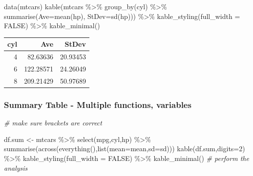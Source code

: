 \documentclass[
]{article}
\newenvironment{Shaded}{\begin{snugshade}}{\end{snugshade}}
\newcommand{\AttributeTok}[1]{\textcolor[rgb]{0.77,0.63,0.00}{#1}}
\newcommand{\CommentTok}[1]{\textcolor[rgb]{0.56,0.35,0.01}{\textit{#1}}}
\newcommand{\ConstantTok}[1]{\textcolor[rgb]{0.00,0.00,0.00}{#1}}
\newcommand{\DecValTok}[1]{\textcolor[rgb]{0.00,0.00,0.81}{#1}}
\newcommand{\FunctionTok}[1]{\textcolor[rgb]{0.00,0.00,0.00}{#1}}
\newcommand{\NormalTok}[1]{#1}
\newcommand{\OtherTok}[1]{\textcolor[rgb]{0.56,0.35,0.01}{#1}}
\newcommand{\SpecialCharTok}[1]{\textcolor[rgb]{0.00,0.00,0.00}{#1}}
\begin{document}
\begin{Shaded}
\begin{Highlighting}[]
\FunctionTok{data}\NormalTok{(mtcars)}
\FunctionTok{kable}\NormalTok{(mtcars }\SpecialCharTok{\%\textgreater{}\%} \FunctionTok{group\_by}\NormalTok{(cyl) }\SpecialCharTok{\%\textgreater{}\%} \FunctionTok{summarise}\NormalTok{(}\AttributeTok{Ave=}\FunctionTok{mean}\NormalTok{(hp), }\AttributeTok{StDev=}\FunctionTok{sd}\NormalTok{(hp))) }\SpecialCharTok{\%\textgreater{}\%} 
  \FunctionTok{kable\_styling}\NormalTok{(}\AttributeTok{full\_width =} \ConstantTok{FALSE}\NormalTok{) }\SpecialCharTok{\%\textgreater{}\%} \FunctionTok{kable\_minimal}\NormalTok{()}
\end{Highlighting}
\end{Shaded}

\begin{table}
\centering
\begin{tabular}{r|r|r}
\hline
cyl & Ave & StDev\\
\hline
4 & 82.63636 & 20.93453\\
\hline
6 & 122.28571 & 24.26049\\
\hline
8 & 209.21429 & 50.97689\\
\hline
\end{tabular}
\end{table}

\hypertarget{summary-table---multiple-functions-variables}{%
\subsubsection{Summary Table - Multiple functions, variables}\label{summary-table---multiple-functions-variables}}

\begin{Shaded}
\begin{Highlighting}[]
\CommentTok{\# make sure brackets are correct}

\NormalTok{df.sum }\OtherTok{\textless{}{-}}\NormalTok{ mtcars }\SpecialCharTok{\%\textgreater{}\%}  \FunctionTok{select}\NormalTok{(mpg,cyl,hp) }\SpecialCharTok{\%\textgreater{}\%}
  \FunctionTok{summarise}\NormalTok{(}\FunctionTok{across}\NormalTok{(}\FunctionTok{everything}\NormalTok{(),}\FunctionTok{list}\NormalTok{(}\AttributeTok{mean=}\NormalTok{mean,}\AttributeTok{sd=}\NormalTok{sd)))}
\FunctionTok{kable}\NormalTok{(df.sum,}\AttributeTok{digits=}\DecValTok{2}\NormalTok{) }\SpecialCharTok{\%\textgreater{}\%} \FunctionTok{kable\_styling}\NormalTok{(}\AttributeTok{full\_width =} \ConstantTok{FALSE}\NormalTok{) }\SpecialCharTok{\%\textgreater{}\%}
  \FunctionTok{kable\_minimal}\NormalTok{() }\CommentTok{\# perform the analysis}
\end{Highlighting}
\end{Shaded}
\end{document}

